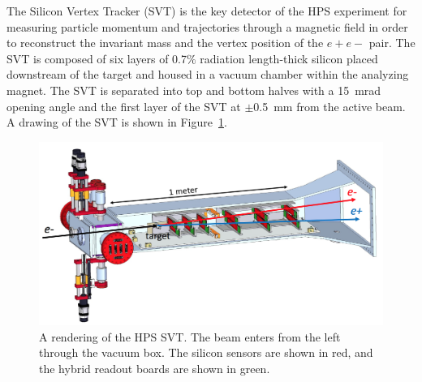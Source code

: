 The Silicon Vertex Tracker (SVT) is the key detector of the HPS experiment for measuring particle momentum and trajectories through a magnetic field in order to reconstruct the invariant mass and the vertex position of the $e+e-$ pair. The SVT is composed of six layers of 0.7$\%$ radiation length-thick silicon placed downstream of the target and housed in a vacuum chamber within the analyzing magnet. The SVT is separated into top and bottom halves with a 15~mrad opening angle and the first layer of the SVT at $\pm$0.5~mm from the active beam. A drawing of the SVT is shown in Figure~\ref{Figure:svt}.

\begin{figure}[H]
  \centering
      \includegraphics[width=1.0\textwidth]{pics/experiment/svt.png}
  \caption[Rendering of the HPS SVT]{A rendering of the HPS SVT. The beam enters from the left through the vacuum box. The silicon sensors are shown in red, and the hybrid readout boards are shown in green.}
  \label{Figure:svt}
\end{figure}


